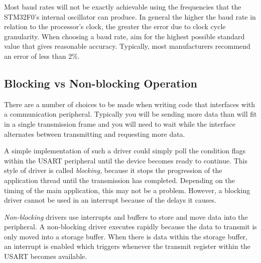 \documentclass[11pt,fleqn]{book} %
\begin{document}
Most baud rates will not be exactly achievable using the frequencies that the STM32F0's internal oscillator can produce. In general the higher the baud rate in relation to the processor's clock, the greater the error due to clock cycle granularity. When choosing a baud rate, aim for the highest possible standard value that gives reasonable accuracy. Typically, most manufacturers recommend an error of less than 2\%. 


\subsection{Blocking vs Non-blocking Operation}
There are a number of choices to be made when writing code that interfaces with a communication peripheral. Typically you will be sending more data than will fit in a single transmission frame and you will need to wait while the interface alternates between transmitting and requesting more data.

A simple implementation of such a driver could simply poll the condition flags within the USART peripheral until the device becomes ready to continue. This style of driver is called \textit{blocking,} because it stops the progression of the application thread until the transmission has completed. Depending on the timing of the main application, this may not be a problem. However, a blocking driver cannot be used in an interrupt because of the delays it causes. 

\textit{Non-blocking} drivers use interrupts and buffers to store and move data into the peripheral. A non-blocking driver executes rapidly because the data to transmit is only moved into a storage buffer. When there is data within the storage buffer, an interrupt is enabled which triggers whenever the transmit register within the USART becomes available. 
\end{document}
